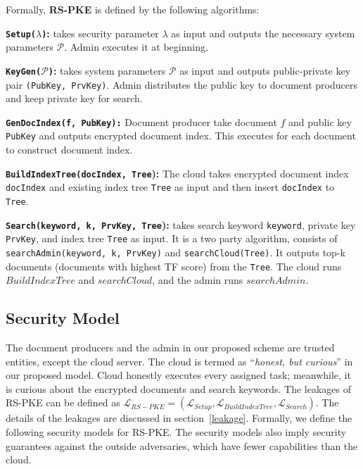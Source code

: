 \documentclass[sigconf,pdftex]{acmart}
\begin{document}
Formally, \textbf{RS-PKE} is defined by the following algorithms:

 {\textbf{\texttt{Setup($\lambda$)}:}} takes security parameter $\lambda$ as input and outputs the necessary system parameters $\mathcal{P}$. Admin executes it at beginning. 
    
    
 {\textbf{\texttt{KeyGen($\mathcal{P}$)}:}} takes system parameters $\mathcal{P}$ as input and outputs public-private key pair \texttt{(PubKey, PrvKey)}. Admin distributes the public key to document producers and keep private key for search.
    
 {\textbf{\texttt{{GenDocIndex(f, PubKey}):}}} Document producer take document $f$ and public key \texttt{PubKey} and outputs encrypted document index. This executes for each document to construct document index.
    
    
{\textbf{\texttt{BuildIndexTree(docIndex, Tree}):}} The cloud takes encrypted document index \texttt{docIndex} and existing index tree \texttt{Tree} as input and then insert \texttt{docIndex} to \texttt{Tree}.
    
{\textbf{\texttt{Search(keyword, k, PrvKey, Tree}):}} takes search keyword \texttt{keyword}, private key \texttt{PrvKey}, and index tree \texttt{Tree} as input. It is a two party algorithm, consists of \texttt{searchAdmin(keyword, k, PrvKey)} and \texttt{searchCloud(Tree)}. It outputs top-k documents (documents with highest TF score) from the \texttt{Tree}. The cloud runs ${BuildIndexTree}$ and ${searchCloud}$, and the admin runs ${searchAdmin}$.



\subsection{Security Model}\label{security-model}



The document producers and the admin in our proposed scheme are trusted entities, except the cloud server. The cloud is termed as ``\textit{honest, but curious}'' in our proposed model. Cloud honestly executes every assigned task; meanwhile, it is curious about the encrypted documents and search keywords. The leakages of RS-PKE can be defined as $\mathcal{L}_{RS-PKE} = (\mathcal{L}_{Setup}, \mathcal{L}_{BuildIndexTree}, \mathcal{L}_{Search})$. The details of the leakages are discussed in section~\ref{leakage}. Formally, we define the following security models for RS-PKE. The security models also imply security guarantees against the outside adversaries, which have fewer capabilities than the cloud.
\end{document}
